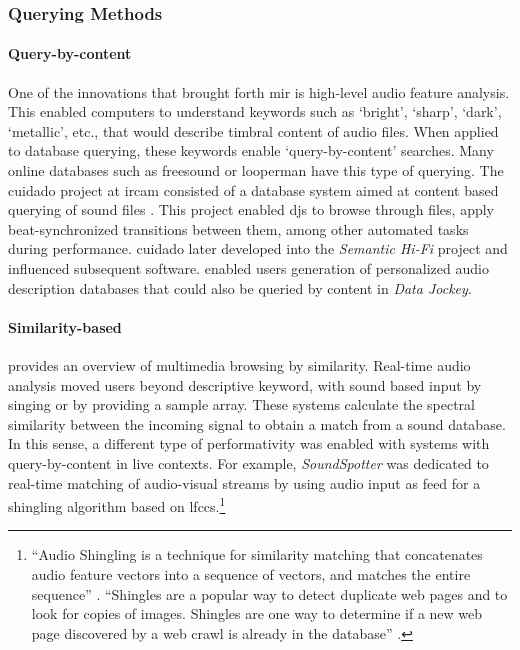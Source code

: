 \subsubsection{Querying Methods}
{
	\paragraph{Query-by-content}
	One of the innovations that brought forth \gls{mir} is high-level audio feature analysis. This enabled computers to understand keywords such as `bright', `sharp', `dark', `metallic', etc., that would describe timbral content of audio files. When applied to database querying, these keywords enable `query-by-content' searches. Many online databases such as \gls{freesound} or \gls{looperman} have this type of querying. The \gls{cuidado} project at \gls{ircam} consisted of a database system aimed at content based querying of sound files \parencites{DBLP:conf/ismir/VinetHP02}{DBLP:conf/icmc/VinetHP02}{DBLP:conf/icmc/Vinet05}. This project enabled \glspl{dj} to browse through files, apply beat-synchronized transitions between them, among other automated tasks during performance. \gls{cuidado} later developed into the \textit{Semantic Hi-Fi} project and influenced subsequent software. \textcite{icmc/bbp2372.2007.117} enabled users generation of personalized audio description databases that could also be queried by content in \textit{Data Jockey}.

	\paragraph{Similarity-based}
	\textcite{Frisson2015} provides an overview of multimedia browsing by similarity. Real-time audio analysis moved users beyond descriptive keyword, with sound based input by singing or by providing a sample array. These systems calculate the spectral similarity between the incoming signal to obtain a match from a sound database. In this sense, a different type of performativity was enabled with systems with query-by-content in live contexts. For example, \textit{SoundSpotter} \parencite{DBLP:conf/icmc/CaseyG07} was dedicated to real-time matching of audio-visual streams by using audio input as feed for a shingling algorithm based on \glspl{lfcc}.\footnote{``Audio Shingling is a technique for similarity matching that concatenates audio feature vectors into a sequence of vectors, and matches the entire sequence'' \parencite{DBLP:conf/icmc/CaseyG07}. ``Shingles are a popular way to detect duplicate web pages and to look for copies of images. Shingles are one way to determine if a new web page discovered by a web crawl is already in the database'' \parencite{DBLP:conf/ismir/CaseyS06}.}

}
